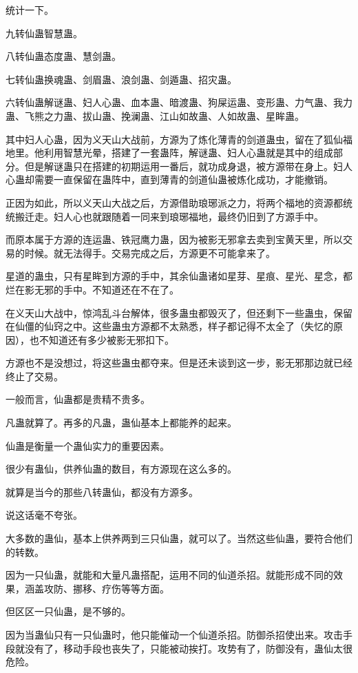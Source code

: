 \begin{this_body}
统计一下。

九转仙蛊智慧蛊。

八转仙蛊态度蛊、慧剑蛊。

七转仙蛊换魂蛊、剑眉蛊、浪剑蛊、剑遁蛊、招灾蛊。

六转仙蛊解谜蛊、妇人心蛊、血本蛊、暗渡蛊、狗屎运蛊、变形蛊、力气蛊、我力蛊、飞熊之力蛊、拔山蛊、挽澜蛊、江山如故蛊、人如故蛊、星眸蛊。

其中妇人心蛊，因为义天山大战前，方源为了炼化薄青的剑道蛊虫，留在了狐仙福地里。他利用智慧光晕，搭建了一套蛊阵，解谜蛊、妇人心蛊就是其中的组成部分。但是解谜蛊只在搭建的初期运用一番后，就功成身退，被方源带在身上。妇人心蛊却需要一直保留在蛊阵中，直到薄青的剑道仙蛊被炼化成功，才能撤销。

正因为如此，所以义天山大战之后，方源借助琅琊派之力，将两个福地的资源都统统搬迁走。妇人心也就跟随着一同来到琅琊福地，最终仍旧到了方源手中。

而原本属于方源的连运蛊、铁冠鹰力蛊，因为被影无邪拿去卖到宝黄天里，所以交易的时候。就无法得手。交易完成之后，方源更不可能拿来了。

星道的蛊虫，只有星眸到方源的手中，其余仙蛊诸如星芽、星痕、星光、星念，都烂在影无邪的手中。不知道还在不在了。

在义天山大战中，惊鸿乱斗台解体，很多蛊虫都毁灭了，但还剩下一些蛊虫，保留在仙僵的仙窍之中。这些蛊虫方源都不太熟悉，样子都记得不太全了（失忆的原因），也不知道还有多少被影无邪扣下。

方源也不是没想过，将这些蛊虫都夺来。但是还未谈到这一步，影无邪那边就已经终止了交易。

一般而言，仙蛊都是贵精不贵多。

凡蛊就算了。再多的凡蛊，蛊仙基本上都能养的起来。

仙蛊是衡量一个蛊仙实力的重要因素。

很少有蛊仙，供养仙蛊的数目，有方源现在这么多的。

就算是当今的那些八转蛊仙，都没有方源多。

说这话毫不夸张。

大多数的蛊仙，基本上供养两到三只仙蛊，就可以了。当然这些仙蛊，要符合他们的转数。

因为一只仙蛊，就能和大量凡蛊搭配，运用不同的仙道杀招。就能形成不同的效果，涵盖攻防、挪移、疗伤等等方面。

但区区一只仙蛊，是不够的。

因为当蛊仙只有一只仙蛊时，他只能催动一个仙道杀招。防御杀招使出来。攻击手段就没有了，移动手段也丧失了，只能被动挨打。攻势有了，防御没有，蛊仙太很危险。


\end{this_body}

